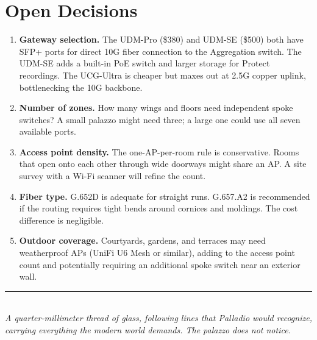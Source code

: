 \documentclass[10pt, letterpaper]{article}
\begin{document}
\section{Open Decisions}

\begin{enumerate}
  \item \textbf{Gateway selection.} The UDM-Pro (\$380) and UDM-SE (\$500) both have SFP+ ports for direct 10G fiber connection to the Aggregation switch. The UDM-SE adds a built-in PoE switch and larger storage for Protect recordings. The UCG-Ultra is cheaper but maxes out at 2.5G copper uplink, bottlenecking the 10G backbone.
  \item \textbf{Number of zones.} How many wings and floors need independent spoke switches? A small palazzo might need three; a large one could use all seven available ports.
  \item \textbf{Access point density.} The one-AP-per-room rule is conservative. Rooms that open onto each other through wide doorways might share an AP. A site survey with a Wi-Fi scanner will refine the count.
  \item \textbf{Fiber type.} G.652D is adequate for straight runs. G.657.A2 is recommended if the routing requires tight bends around cornices and moldings. The cost difference is negligible.
  \item \textbf{Outdoor coverage.} Courtyards, gardens, and terraces may need weatherproof APs (UniFi U6 Mesh or similar), adding to the access point count and potentially requiring an additional spoke switch near an exterior wall.
\end{enumerate}

\vfill
{\color{rule}\rule{\textwidth}{1pt}}\\[0.2em]
{\footnotesize\itshape\color{muted}A quarter-millimeter thread of glass, following lines that Palladio would recognize, carrying everything the modern world demands. The palazzo does not notice.}
\end{document}
